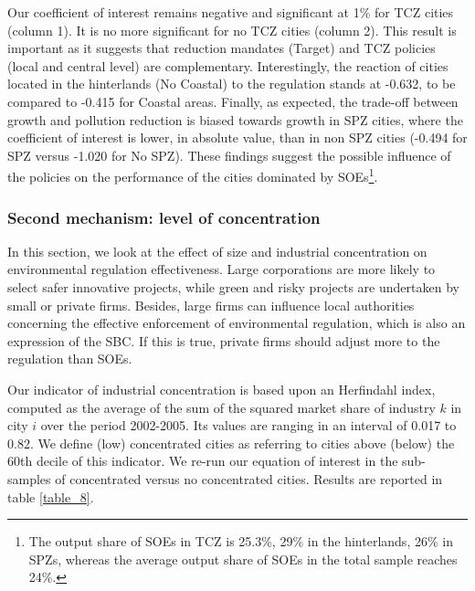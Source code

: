 \documentclass[12pt]{article}
\begin{document}
Our coefficient of interest remains negative and significant at 1$\%$ for TCZ cities (column 1). It is no more significant for no TCZ cities (column 2). This result is important as it suggests that reduction mandates (Target) and TCZ policies (local and central level) are complementary.  Interestingly, the reaction of cities located in the hinterlands (No Coastal) to the regulation stands at -0.632, to be compared to -0.415 for Coastal areas. Finally, as expected, the trade-off between growth and pollution reduction is biased towards growth in SPZ cities, where the coefficient of interest is lower, in absolute value, than in non SPZ cities (-0.494 for SPZ versus -1.020 for No SPZ). These findings suggest the possible influence of the policies on the performance of the cities dominated by SOEs\footnote{The output share of SOEs in TCZ is 25.3\%, 29\% in the hinterlands, 26\% in SPZs, whereas the average output share of SOEs in the total sample reaches 24\%.}.


\subsubsection{Second mechanism: level of concentration} \label{concentration}





In this section, we look at the effect of size and industrial concentration on environmental regulation effectiveness. Large corporations are more likely to select safer innovative projects, while green and risky projects are undertaken by small or private firms. Besides, large firms can influence local authorities concerning the effective enforcement of environmental regulation, which is also an expression of the SBC. If this is true, private firms should adjust more to the regulation than SOEs. 


Our indicator of industrial concentration is based upon an Herfindahl index, computed as the average of the sum of the squared market share of industry $k$ in city $i$ over the period 2002-2005. Its values are ranging in an interval of 0.017 to 0.82. We define (low) concentrated cities as referring to cities above (below) the 60th decile of this indicator. We re-run our equation of interest in the sub-samples of concentrated versus no concentrated cities. Results are reported in table \ref{table_8}. 
\end{document}
